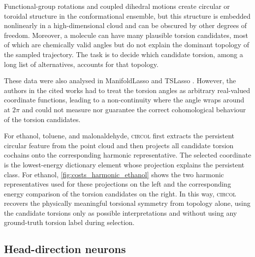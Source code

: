 \documentclass[a4paper,11pt, DIV=10]{scrartcl}
\numberwithin{equation}{section}
\theoremstyle{definition}
\theoremstyle{remark}
\begin{document}
Functional-group rotations and coupled dihedral motions create circular or toroidal structure in the conformational ensemble, but this structure is embedded nonlinearly in a high-dimensional cloud and can be obscured by other degrees of freedom.
Moreover, a molecule can have many plausible torsion candidates, most of which are chemically valid angles but do not explain the dominant topology of the sampled trajectory.
The task is to decide which candidate torsion, among a long list of alternatives, accounts for that topology.

These data were also analysed in ManifoldLasso and TSLasso \cite{koelle2022manifold,koelle2024consistency}.
However, the authors in the cited works had to treat the torsion angles as arbitrary real-valued coordinate functions, leading to a non-continuity where the angle wraps around at $2\pi$ and could not measure nor guarantee the correct cohomological behaviour of the torsion candidates.

For ethanol, toluene, and malonaldehyde, \textsc{circol} first extracts the persistent circular feature from the point cloud and then projects all candidate torsion cochains onto the corresponding harmonic representative.
The selected coordinate is the lowest-energy dictionary element whose projection explains the persistent class.
For ethanol, \cref{fig:costs_harmonic_ethanol} shows the two harmonic representatives used for these projections on the left and the corresponding energy comparison of the torsion candidates on the right.
In this way, \textsc{circol} recovers the physically meaningful torsional symmetry from topology alone, using the candidate torsions only as possible interpretations and without using any ground-truth torsion label during selection.

\subsection{Head-direction neurons}
\label{sec:head-direction-experiment}
\end{document}

